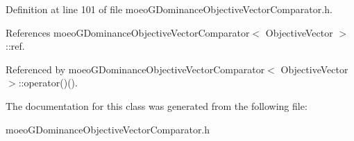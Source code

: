 Definition at line 101 of file moeo\-GDominance\-Objective\-Vector\-Comparator.h.

References moeo\-GDominance\-Objective\-Vector\-Comparator$<$ Objective\-Vector $>$::ref.

Referenced by moeo\-GDominance\-Objective\-Vector\-Comparator$<$ Objective\-Vector $>$::operator()().

The documentation for this class was generated from the following file:\begin{CompactItemize}
\item 
moeo\-GDominance\-Objective\-Vector\-Comparator.h\end{CompactItemize}

